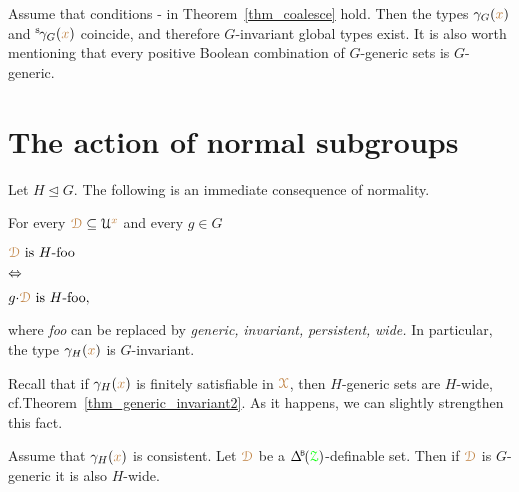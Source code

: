 \begin{remark}\label{rem_coalesce} 
  Assume that conditions - in Theorem~\ref{thm_coalesce} hold.
  Then the types $\gamma_G({\color{brown} x})$ and ${}^{\rm s}\kern-.2ex\gamma_G({\color{brown} x})$ coincide, and therefore $G$-invariant global types exist.
  It is also worth mentioning that every positive Boolean combination of $G$-generic sets is $G$-generic.
\end{remark}

\section{The action of normal subgroups}\label{normalsubgroups}

Let $H\trianglelefteq G$.
The following is an immediate consequence of normality.

\begin{remark}\label{rem_invariance_normalsubg}
\newlength{\ceqlength}
\settowidth{\ceqlength}{p(x) is H-invariant\ }
\def\medrel#1{\parbox[t]{5ex}{$\displaystyle\hfil #1$}}
\def\ceq#1#2#3{\parbox[t]{\ceqlength}{$\displaystyle #1$}\medrel{#2}{$\displaystyle #3$}}
%
  For every ${\color{brown}\EuScript D}\subseteq\EuScript U^{\color{brown} x}$ and every $g\in G$
  
  \ceq{\hfill\mrD\textrm{ is }H\textrm{-foo}}{\IFF}{g{\cdot}\mrD\textrm{ is }H\textrm{-foo},}
  
  where \textit{foo\/} can be replaced by \textit{generic,} \textit{invariant,} \textit{persistent,} \textit{wide.}
  In particular, the type $\gamma_H({\color{brown} x})$ is $G$-invariant.
\end{remark}

Recall that if $\gamma_H({\color{brown} x})$ is finitely satisfiable in ${\color{brown}\EuScript X}$, then $H$-generic sets are $H$-wide, cf.\@ Theorem~\ref{thm_generic_invariant2}.
As it happens, we can slightly strengthen this fact.

\begin{proposition}\label{prop_Ggeneric_Hpersistent}
  Assume that $\gamma_H({\color{brown} x})$ is consistent.
  Let ${\color{brown}\EuScript D}$ be a $\BDelta(\grZ)$-definable set.
  Then if ${\color{brown}\EuScript D}$ is $G$-generic it is also $H$-wide.
\end{proposition}

